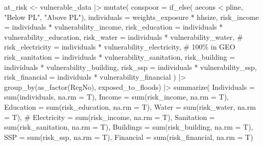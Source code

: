\documentclass[
  letterpaper,
  DIV=11,
  numbers=noendperiod]{scrartcl}
\newenvironment{Shaded}{}{}
\newcommand{\AttributeTok}[1]{\textcolor[rgb]{0.84,0.23,0.29}{#1}}
\newcommand{\CommentTok}[1]{\textcolor[rgb]{0.42,0.45,0.49}{#1}}
\newcommand{\FunctionTok}[1]{\textcolor[rgb]{0.44,0.26,0.76}{#1}}
\newcommand{\NormalTok}[1]{\textcolor[rgb]{0.14,0.16,0.18}{#1}}
\newcommand{\OtherTok}[1]{\textcolor[rgb]{0.44,0.26,0.76}{#1}}
\newcommand{\SpecialCharTok}[1]{\textcolor[rgb]{0.00,0.36,0.77}{#1}}
\newcommand{\StringTok}[1]{\textcolor[rgb]{0.01,0.18,0.38}{#1}}
\begin{document}
\begin{Shaded}
\begin{Highlighting}[]
\NormalTok{at\_risk }\OtherTok{\textless{}{-}}\NormalTok{ vulnerable\_data }\SpecialCharTok{|\textgreater{}}
  \FunctionTok{mutate}\NormalTok{(}
    \AttributeTok{conspoor =} \FunctionTok{if\_else}\NormalTok{(}
\NormalTok{      aecons }\SpecialCharTok{\textless{}}\NormalTok{ pline, }\StringTok{"Below PL"}\NormalTok{, }\StringTok{"Above PL"}\NormalTok{),}
    \AttributeTok{individuals =}\NormalTok{ weights\_exposure }\SpecialCharTok{*}\NormalTok{ hhsize,}
    \AttributeTok{risk\_income =}\NormalTok{ individuals }\SpecialCharTok{*}\NormalTok{ vulnerability\_income,}
    \AttributeTok{risk\_education =}\NormalTok{ individuals }\SpecialCharTok{*}\NormalTok{ vulnerability\_education,}
    \AttributeTok{risk\_water =}\NormalTok{ individuals }\SpecialCharTok{*}\NormalTok{ vulnerability\_water,}
    \CommentTok{\# risk\_electricity = individuals * vulnerability\_electricity, \# 100\% in GEO}
    \AttributeTok{risk\_sanitation =}\NormalTok{ individuals }\SpecialCharTok{*}\NormalTok{ vulnerability\_sanitation,}
    \AttributeTok{risk\_building =}\NormalTok{ individuals }\SpecialCharTok{*}\NormalTok{ vulnerability\_building,}
    \AttributeTok{risk\_ssp =}\NormalTok{ individuals }\SpecialCharTok{*}\NormalTok{ vulnerability\_ssp,}
    \AttributeTok{risk\_financial =}\NormalTok{ individuals }\SpecialCharTok{*}\NormalTok{ vulnerability\_financial}
\NormalTok{  ) }\SpecialCharTok{|\textgreater{}} 
  \FunctionTok{group\_by}\NormalTok{(}\FunctionTok{as\_factor}\NormalTok{(RegNo), exposed\_to\_floods) }\SpecialCharTok{|\textgreater{}} 
  \FunctionTok{summarize}\NormalTok{(}
    \AttributeTok{Individuals =} \FunctionTok{sum}\NormalTok{(individuals, }\AttributeTok{na.rm =}\NormalTok{ T),}
    \AttributeTok{Income =} \FunctionTok{sum}\NormalTok{(risk\_income, }\AttributeTok{na.rm =}\NormalTok{ T),}
    \AttributeTok{Education =} \FunctionTok{sum}\NormalTok{(risk\_education, }\AttributeTok{na.rm =}\NormalTok{ T),}
    \AttributeTok{Water =} \FunctionTok{sum}\NormalTok{(risk\_water, }\AttributeTok{na.rm =}\NormalTok{ T),}
    \CommentTok{\# Electricity = sum(risk\_income, na.rm = T),}
    \AttributeTok{Sanitation =} \FunctionTok{sum}\NormalTok{(risk\_sanitation, }\AttributeTok{na.rm =}\NormalTok{ T),}
    \AttributeTok{Buildings =} \FunctionTok{sum}\NormalTok{(risk\_building, }\AttributeTok{na.rm =}\NormalTok{ T),}
    \AttributeTok{SSP =} \FunctionTok{sum}\NormalTok{(risk\_ssp, }\AttributeTok{na.rm =}\NormalTok{ T),}
    \AttributeTok{Financial =} \FunctionTok{sum}\NormalTok{(risk\_financial, }\AttributeTok{na.rm =}\NormalTok{ T)}

\end{Highlighting}
\end{Shaded}
\end{document}
